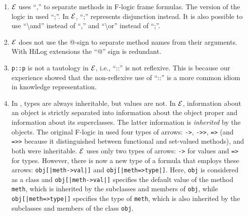 \documentclass[11pt]{article}
\newcommand{\ERGO}{\mbox{\ensuremath{\cal{E}}\smaller{{\sc{RGO}}}}\xspace}
\newcommand{\FLSYSTEM}{\ERGO}
\newcommand{\bs}{\textbackslash}
\begin{document}
\begin{enumerate}
\item \FLSYSTEM uses ``,'' to separate methods in F-logic frame formulas. The version of
  the logic in \cite{KLW95} used ``;''. In \FLSYSTEM, ``;'' represents
  disjunction instead. It is also possible to use ``\bs{}and'' instead of ``,''
  and ``\bs{}or'' instead of ``;''.
\item \FLSYSTEM does not use the @-sign to separate method names from their
  arguments. With HiLog extensions the ``@'' sign is redundant.
\item  {\tt p::p} is not a tautology in \FLSYSTEM, i.e., ``::'' is not
  reflexive. This is because our experience showed that the non-reflexive
  use of ``::'' is a more common idiom in knowledge representation.
\item In \cite{KLW95}, types are always inheritable, but values are not.
  In \FLSYSTEM, information about an object
  is strictly separated into information about the object proper
  and information about its superclasses. The latter information is
  \emph{inherited} by the objects. 
  The original F-logic in
  \cite{KLW95} used four types of arrows:
  \texttt{->}, \texttt{->{}>},   {\tt =>} (and {\tt =>{}>}
  because it distinguished
  between functional and set-valued methods), and both were inheritable.
  \FLSYSTEM uses only two types of arrows: \texttt{->} for values and
  \texttt{=>} for types. However, there is now a new type of a formula that
  employs these arrows: \texttt{obj[|meth->val|]}  and
  \texttt{obj[|meth=>type|]}. Here, \texttt{obj} is considered as a class
  and \texttt{obj[|meth->val|]} specifies the default value of the method
  \texttt{meth}, which is inherited by the subclasses and
  members of \texttt{obj}, while \texttt{obj[|meth=>type|]} specifies
  the type of \texttt{meth}, which is also inherited by the subclasses and
  members of the class \texttt{obj}.  


\end{enumerate}
\end{document}
